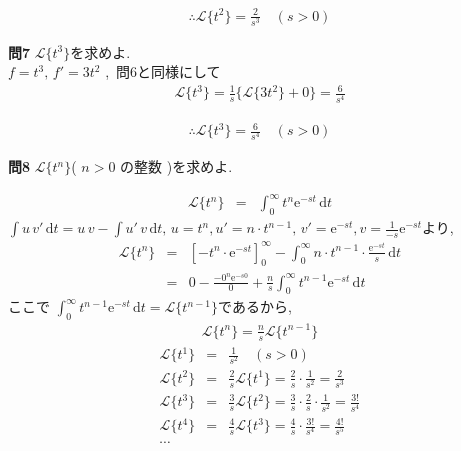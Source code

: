 ﻿\documentclass[a4j]{jarticle}
\begin{document}
\begin{eqnarray*}
\therefore \mathcal{L} \{ t^2 \} =  \frac{2}{s^3} \quad(s>0)
\end{eqnarray*}

\noindent
\large{\bf{問7}}\/ \( \mathcal{L} \{ t^3 \} \)を求めよ. \\

\( f=t^3 ,\, f'=3t^2 \) ,\, 問6と同様にして
\begin{eqnarray*}
\mathcal{L} \{ t^3 \} = \frac{1}{s} \{ \mathcal{L} \{ 3t^2 \} + 0 \} = \frac{6}{s^4}
\end{eqnarray*}

\begin{eqnarray*}
\therefore \mathcal{L} \{ t^3 \} =  \frac{6}{s^4} \quad(s>0)
\end{eqnarray*}

\noindent
\large{\bf{問8}}\/ \( \mathcal{L} \{ t^n \} \)\quad( \( n > 0\) の整数 )を求めよ.

\begin{eqnarray*}
\mathcal{L} \{ t^n \} &=& \int_0^\infty{ t^n \mathrm{e}^{-st} \, \mathrm{d}t }
\end{eqnarray*}
%
\( \int{ u\,v' } \, \mathrm{d}t = u\,v - \int{ u'\,v } \, \mathrm{d}t ,\, u=t^n , u'=n\cdot t^{n-1} ,\, v'=\mathrm{e}^{-st}, v=\frac{1}{-s}\mathrm{e}^{-st} \)より,
%
\begin{eqnarray*}
\mathcal{L} \{ t^n \} &=& \left[ -t^n \cdot \mathrm{e}^{-st} \right]_0^\infty - \int_0^\infty{n \cdot t^{n-1} \cdot \frac{\mathrm{e}^{-st}}{s} \, \mathrm{d}t} \\
                      &=& 0 - \frac{-0^n \mathrm{e}^{-s0}}{0} + \frac{n}{s}\int_0^\infty{t^{n-1}\mathrm{e}^{-st}\, \mathrm{d}t }
\end{eqnarray*}
ここで \(\int_0^\infty{t^{n-1}\mathrm{e}^{-st}\, \mathrm{d}t } = \mathcal{L} \{ t^{n-1} \} \)であるから,
\begin{eqnarray*}
\mathcal{L} \{ t^{n} \} = \frac{n}{s}\mathcal{L} \{ t^{n-1} \}
\end{eqnarray*}
%
\begin{eqnarray*}
\mathcal{L} \{ t^{1} \} &=& \frac{1}{s^2}\quad(s>0) \\
\mathcal{L} \{ t^{2} \} &=& \frac{2}{s}\mathcal{L} \{ t^{1} \} = \frac{2}{s}\cdot\frac{1}{s^2} = \frac{2}{s^3} \\
\mathcal{L} \{ t^{3} \} &=& \frac{3}{s}\mathcal{L} \{ t^{2} \} = \frac{3}{s}\cdot\frac{2}{s}\cdot\frac{1}{s^2} = \frac{3!}{s^4} \\
\mathcal{L} \{ t^{4} \} &=& \frac{4}{s}\mathcal{L} \{ t^{3} \} = \frac{4}{s}\cdot\frac{3!}{s^4}=\frac{4!}{s^5} \\
\dotsi
\end{eqnarray*}
\end{document}
